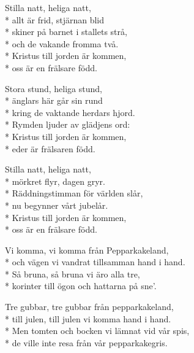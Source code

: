 \begin{SongText}
    \begin{SongVerse}
        Stilla natt, heliga natt,\\*%
        allt är frid, stjärnan blid\\*%
        skiner på barnet i stallets strå,\\*%
        och de vakande fromma två.\\*%
        Kristus till jorden är kommen,\\*%
        oss är en frälsare född.
    \end{SongVerse}
    \begin{SongVerse}
        Stora stund, heliga stund,\\*%
        änglars här går sin rund\\*%
        kring de vaktande herdars hjord.\\*%
        Rymden ljuder av glädjens ord:\\*%
        Kristus till jorden är kommen,\\*%
        eder är frälsaren född.
    \end{SongVerse}
    \begin{SongVerse}
        Stilla natt, heliga natt,\\*%
        mörkret flyr, dagen gryr.\\*%
        Räddningstimman för världen slår,\\*%
        nu begynner vårt jubelår.\\*%
        Kristus till jorden är kommen,\\*%
        oss är en frälsare född.
    \end{SongVerse}
    \begin{SongVerse}
    \end{SongVerse}
\end{SongText}
\begin{SongText}
    \begin{SongVerse}
        Vi komma, vi komma från Pepparkakeland,\\*%
        och vägen vi vandrat tillsamman hand i hand.\\*%
        Så bruna, så bruna vi äro alla tre,\\*%
        korinter till ögon och hattarna på sne’.
    \end{SongVerse}
    \begin{SongVerse}
        Tre gubbar, tre gubbar från pepparkakeland,\\*%
        till julen, till julen vi komma hand i hand.\\*%
        Men tomten och bocken vi lämnat vid vår spis,\\*%
        de ville inte resa från vår pepparkakegris.
    \end{SongVerse}
    \begin{SongVerse}
    \end{SongVerse}
\end{SongText}
